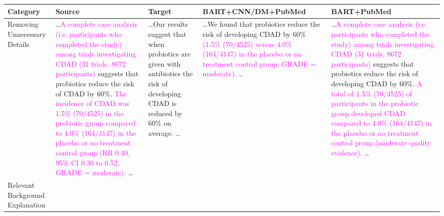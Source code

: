 \documentclass[letterpaper, table]{article} %
\begin{document}


\begin{table*}[t!]
\centering
\tiny
\begin{tabular}{@{}m{1.4cm}<{\centering}m{3.55cm}<{\centering}m{3.55cm}<{\centering}m{3.55cm}<{\centering}m{3.55cm}<{\centering} @{}}
\toprule
\textbf{Category}  & \textbf{Source}   & \textbf{Target}  & \textbf{BART+CNN/DM+PubMed} & \textbf{BART+PubMed}  \\ \midrule
Removing Unnecessary Details 
& \ldots \textcolor{magenta}{A complete case analysis (i.e. participants who completed the study) among trials investigating CDAD (31 trials, 8672 participants)} suggests that probiotics reduce the risk of CDAD by 60\%. \textcolor{magenta}{The incidence of CDAD was 1.5\% (70/4525) in the probiotic group compared to 4.0\% (164/4147) in the placebo or no treatment control group (RR 0.40, 95\% CI 0.30 to 0.52; GRADE = moderate)}. \ldots \cite{goldenberg2017probiotics} 
& \ldots Our results suggest that when probiotics are given with antibiotics the risk of developing CDAD is reduced by 60\% on average. \ldots
& \ldots We found that probiotics reduce the risk of developing CDAD by 60\% \textcolor{magenta}{(1.5\% (70/4525) versus 4.0\% (164/4147) in the placebo or no treatment control group; GRADE = moderate)}. \ldots
& \ldots \textcolor{magenta}{A complete case analysis (i.e. participants who completed the study) among trials investigating CDAD (31 trials, 8672 participants)} suggests that probiotics reduce the risk of developing CDAD by 60\%. \textcolor{magenta}{A total of 1.5\% (70/4525) of participants in the probiotic group developed CDAD compared to 4.0\% (164/4147) in the placebo or no treatment control group (moderate quality evidence)}. \ldots
\\ \midrule
Relevant Background Explanation 

\end{tabular}
\end{table*}
\end{document}
